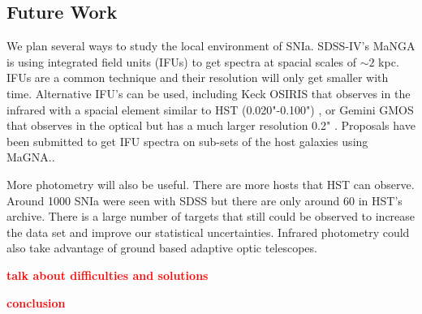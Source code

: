 \documentclass[apj, iop]{emulateapj}
\newcommand{\sn}{SNIa}
\newcommand{\todo}[1]{\textbf{\textcolor{red}{#1}}}
\begin{document}


\subsection{Future Work}\label{future-work-1}

We plan several ways to study the local environment of SNIa. SDSS-IV's MaNGA is using integrated
field units (IFUs) to get spectra at spacial scales of $\sim 2$ kpc. IFUs are a
common technique and their resolution will only get smaller with time.
Alternative IFU's can be used, including Keck OSIRIS that observes in the
infrared with a spacial element similar to HST (0.020"-0.100") \citep{OSIRIS},
or Gemini GMOS that observes in
the optical but has a much larger resolution 0.2" \citep{Gemini}.
Proposals have been submitted to 
get IFU spectra on sub-sets of the host galaxies using MaGNA..


More photometry will also be useful. There are more hosts that HST can observe.
Around 1000 \sn{} were seen with SDSS \citep{Campbell13} but there are only
around 60 in HST's archive. There is a large number of targets that still could be
observed to increase the data set and improve our statistical uncertainties.
Infrared photometry could also take advantage of ground based adaptive optic
telescopes.

\todo{talk about difficulties and solutions}

\todo{conclusion}






\end{document}
